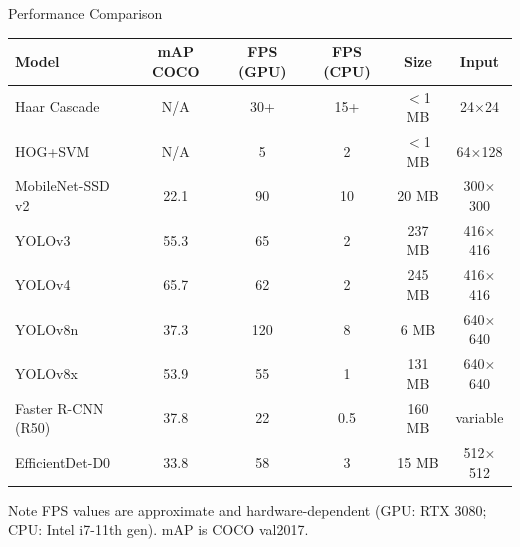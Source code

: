 \documentclass[aspectratio=169]{beamer}
\begin{document}
\begin{frame}{Performance Comparison}
  \begin{center}
  \footnotesize
  \begin{tabular}{lccccc}
    \toprule
    \textbf{Model} & \textbf{mAP COCO} & \textbf{FPS (GPU)} & \textbf{FPS (CPU)} & \textbf{Size} & \textbf{Input}\\
    \midrule
    Haar Cascade        & N/A  & 30+  & 15+ & $<$1 MB  & 24$\times$24\\
    HOG+SVM             & N/A  & 5    & 2   & $<$1 MB  & 64$\times$128\\
    MobileNet-SSD v2    & 22.1 & 90   & 10  & 20 MB    & 300$\times$300\\
    YOLOv3              & 55.3 & 65   & 2   & 237 MB   & 416$\times$416\\
    YOLOv4              & 65.7 & 62   & 2   & 245 MB   & 416$\times$416\\
    YOLOv8n             & 37.3 & 120  & 8   & 6 MB     & 640$\times$640\\
    YOLOv8x             & 53.9 & 55   & 1   & 131 MB   & 640$\times$640\\
    Faster R-CNN (R50)  & 37.8 & 22   & 0.5 & 160 MB   & variable\\
    EfficientDet-D0     & 33.8 & 58   & 3   & 15 MB    & 512$\times$512\\
    \bottomrule
  \end{tabular}
  \end{center}
  \vspace{-4pt}
  \begin{alertblock}{Note}
    FPS values are approximate and hardware-dependent (GPU: RTX 3080; CPU: Intel i7-11th gen).
    mAP is COCO val2017.
  \end{alertblock}
\end{frame}
\end{document}
